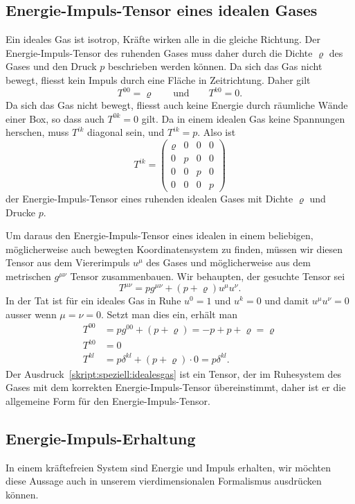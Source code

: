 
\subsection{Energie-Impuls-Tensor eines idealen Gases%
\label{skript:speziell:subsection:idealesgas}}
Ein ideales Gas ist isotrop, Kräfte wirken alle in die gleiche
Richtung.
Der Energie-Impuls-Tensor des ruhenden Gases muss daher durch die
Dichte $\varrho$ des Gases und den Druck $p$ beschrieben werden können.
Da sich das Gas nicht bewegt, fliesst kein Impuls durch eine Fläche
in Zeitrichtung.
Daher gilt
\[
T^{00}
=
\varrho
\qquad
\text{und}
\qquad
T^{k0}
=
0.
\]
Da sich das Gas nicht bewegt, fliesst auch keine Energie durch räumliche
Wände einer Box, so dass auch $T^{0k}=0$ gilt.
Da in einem idealen Gas keine Spannungen herschen, muss $T^{ik}$ diagonal
sein, und $T^{ik}=p$.
Also ist
\[
T^{ik}
=
\begin{pmatrix}
\varrho&0&0&0\\
0&p&0&0\\
0&0&p&0\\
0&0&0&p
\end{pmatrix}
\]
der Energie-Impuls-Tensor eines ruhenden idealen Gases mit Dichte
$\varrho$ und Drucke $p$.

Um daraus den Energie-Impuls-Tensor eines idealen in einem
beliebigen, möglicherweise auch bewegten Koordinatensystem zu
finden, müssen wir diesen Tensor aus dem Viererimpuls $u^\mu$
des Gases und möglicherweise aus dem metrischen $g^{\mu\nu}$ Tensor
zusammenbauen.
Wir behaupten, der gesuchte Tensor sei
\begin{equation}
T^{\mu\nu}
=
p g^{\mu\nu} + (p + \varrho)u^\mu u^\nu.
\label{skript:speziell:idealesgas}
\end{equation}
In der Tat ist für ein ideales Gas in Ruhe $u^0=1$ und $u^k=0$ und damit
$u^\mu u^\nu=0$ ausser wenn $\mu=\nu=0$.
Setzt man dies ein, erhält man
\begin{align*}
T^{00}
&=
pg^{00} + (p+\varrho) = -p+p+\varrho=\varrho
\\
T^{k0}
&=0
\\
T^{kl}
&=
p\delta^{kl}
+
(p+\varrho)\cdot 0
=
p\delta^{kl}.
\end{align*}
Der Ausdruck~\eqref{skript:speziell:idealesgas} ist ein Tensor, der
im Ruhesystem des Gases mit dem korrekten Energie-Impuls-Tensor
übereinstimmt,
daher ist er die allgemeine Form für den Energie-Impuls-Tensor.

\subsection{Energie-Impuls-Erhaltung}
In einem kräftefreien System sind Energie und Impuls erhalten, wir
möchten diese Aussage auch in unserem vierdimensionalen Formalismus
ausdrücken können.


